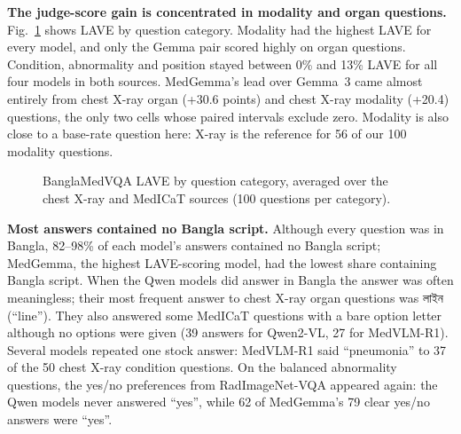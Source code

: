 \documentclass[doublecolumn]{ijcvsplatex}
\newcommand{\bn}[1]{{\bengalifont #1}}
\newcommand{\bn}[1]{\textit{[Bangla]}}
\newcommand{\qwen}{Qwen2-VL}
\newcommand{\medvlm}{MedVLM-R1}
\newcommand{\gemma}{Gemma~3}
\newcommand{\medgemma}{MedGemma}
\begin{document}
\textbf{The judge-score gain is concentrated in modality and organ questions.} Fig.~\ref{fig_bangla} shows LAVE by question category. Modality had the highest LAVE for every model, and only the Gemma pair scored highly on organ questions. Condition, abnormality and position stayed between 0\% and 13\% LAVE for all four models in both sources. \medgemma{}'s lead over \gemma{} came almost entirely from chest X-ray organ (+30.6 points) and chest X-ray modality (+20.4) questions, the only two cells whose paired intervals exclude zero. Modality is also close to a base-rate question here: X-ray is the reference for 56 of our 100 modality questions.

\begin{figure}[tb]
\centering
{}
\caption{BanglaMedVQA LAVE by question category, averaged over the chest X-ray and MedICaT sources (100 questions per category).}
\label{fig_bangla}
\end{figure}

\textbf{Most answers contained no Bangla script.} Although every question was in Bangla, 82--98\% of each model's answers contained no Bangla script; \medgemma{}, the highest LAVE-scoring model, had the lowest share containing Bangla script. When the Qwen models did answer in Bangla the answer was often meaningless; their most frequent answer to chest X-ray organ questions was \bn{লাইন} (``line''). They also answered some MedICaT questions with a bare option letter although no options were given (39 answers for \qwen{}, 27 for \medvlm{}). Several models repeated one stock answer: \medvlm{} said ``pneumonia'' to 37 of the 50 chest X-ray condition questions. On the balanced abnormality questions, the yes/no preferences from RadImageNet-VQA appeared again: the Qwen models never answered ``yes'', while 62 of \medgemma{}'s 79 clear yes/no answers were ``yes''.
\end{document}
